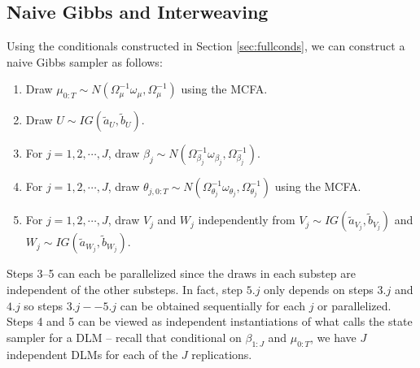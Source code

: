 \documentclass[graybox]{svmult}
\begin{document}
\subsection{Naive Gibbs and Interweaving}\label{sec:Gibbs}
Using the conditionals constructed in Section \ref{sec:fullconds}, we can construct a naive Gibbs sampler as follows:
\begin{enumerate}
\item Draw $\mu_{0:T} \sim N(\Omega_{\mu}^{-1}\omega_{\mu},\Omega_{\mu}^{-1})$ using the MCFA.
\item Draw $U\sim IG(\tilde{a}_U,\tilde{b}_U)$.
\item For $j=1,2,\cdots,J$, draw $\beta_{j} \sim N(\Omega_{\beta_j}^{-1}\omega_{\beta_j},\Omega_{\beta_j}^{-1})$.
\item For $j=1,2,\cdots,J$, draw $\theta_{j,0:T}\sim N(\Omega_{\theta_j}^{-1}\omega_{\theta_j},\Omega_{\theta_j}^{-1})$ using the MCFA.
\item For $j=1,2,\cdots,J$, draw $V_j$ and $W_j$ independently from $V_j\sim IG(\tilde{a}_{V_j}, \tilde{b}_{V_j})$ and $W_j\sim IG(\tilde{a}_{W_j}, \tilde{b}_{W_j})$.
\end{enumerate}
Steps 3--5 can each be parallelized since the draws in each substep are independent of the other substeps. In fact, step $5.j$ only depends on steps $3.j$ and $4.j$ so steps $3.j--5.j$ can be obtained sequentially for each $j$ or parallelized. Steps 4 and 5 can be viewed as independent instantiations of what \citet{simpson2014interweaving} calls the state sampler for a DLM -- recall that conditional on $\beta_{1:J}$ and $\mu_{0:T}$, we have $J$ independent DLMs for each of the $J$ replications.
\end{document}
